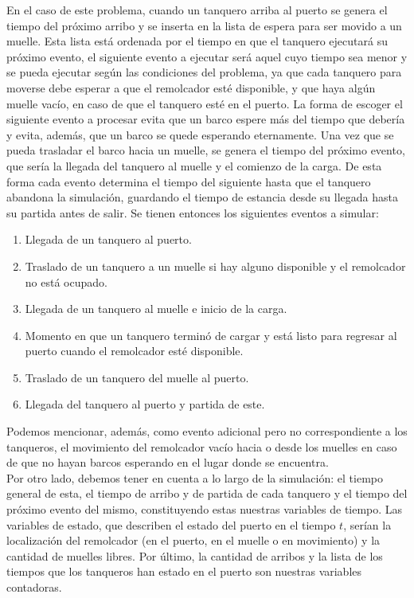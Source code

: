 \documentclass[twoside]{article}
\begin{document}
En el caso de este problema, cuando un tanquero arriba al puerto se genera el tiempo del pr\'oximo arribo y se inserta en la lista de espera para ser movido a un muelle. Esta lista est\'a ordenada por el tiempo en que el tanquero ejecutar\'a su pr\'oximo evento, el siguiente evento a ejecutar ser\'a aquel cuyo tiempo sea menor y se pueda ejecutar seg\'un las condiciones del problema, ya que cada tanquero para moverse debe esperar a que el remolcador est\'e disponible, y que haya alg\'un muelle vac\'io, en caso de que el tanquero est\'e en el puerto. La forma de escoger el siguiente evento a procesar evita que un barco espere m\'as del tiempo que deber\'ia y evita, adem\'as, que un barco se quede esperando eternamente. Una vez que se pueda trasladar el barco hacia un muelle, se genera el tiempo del pr\'oximo evento, que ser\'ia la llegada del tanquero al muelle y el comienzo de la carga. De esta forma cada evento determina el tiempo del siguiente hasta que el tanquero abandona la simulaci\'on, guardando el tiempo de estancia desde su llegada hasta su partida antes de salir. Se tienen entonces los siguientes eventos a simular:
\begin{enumerate}
\item Llegada de un tanquero al puerto.
\item Traslado de un tanquero a un muelle si hay alguno disponible y el remolcador no est\'a ocupado.
\item Llegada de un tanquero al muelle e inicio de la carga.
\item Momento en que un tanquero termin\'o de cargar y est\'a listo para regresar al puerto cuando el remolcador est\'e disponible.
\item Traslado de un tanquero del muelle al puerto.
\item Llegada del tanquero al puerto y partida de este.
\end{enumerate}

Podemos mencionar, adem\'as, como evento adicional pero no correspondiente a los tanqueros, el movimiento del remolcador vac\'io hacia o desde los muelles en caso de que no hayan barcos esperando en el lugar donde se encuentra.\\

Por otro lado, debemos tener en cuenta a lo largo de la simulaci\'on: el tiempo general de esta, el tiempo de arribo y de partida de cada tanquero y el tiempo del pr\'oximo evento del mismo, constituyendo estas nuestras variables de tiempo. Las variables de estado, que describen el estado del puerto en el tiempo $t$, ser\'ian la localizaci\'on del remolcador (en el puerto, en el muelle o en movimiento) y la cantidad de muelles libres. Por \'ultimo, la cantidad de arribos y la lista de los tiempos que los tanqueros han estado en el puerto son nuestras variables contadoras.
\end{document}

